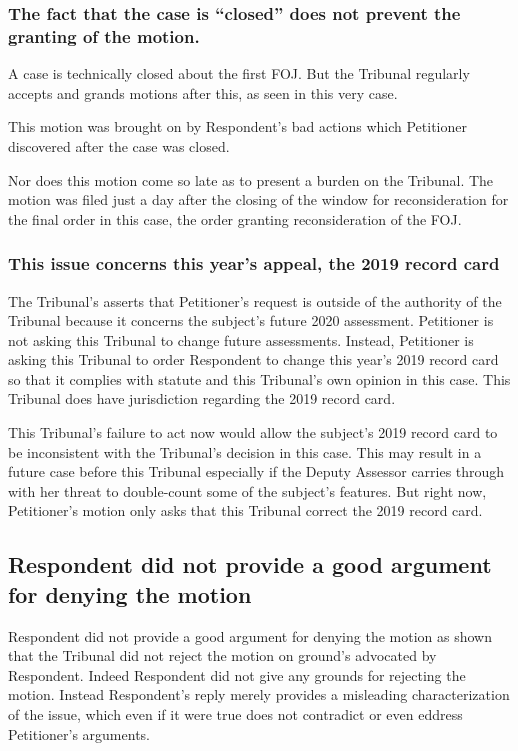 \documentclass[12pt,\documentclassflag]{michiganCourtOfAppealsBrief}
\begin{document}
\subsubsection{The fact that the case is ``closed'' does not prevent the granting of the motion.}

A case is technically closed about the first FOJ. But the Tribunal regularly accepts and grands motions after this, as seen in this very case.

This motion was brought on by Respondent's bad actions which Petitioner discovered after the case was closed.

Nor does this motion come so late as to present a burden on the Tribunal. The motion was filed just a day after the closing of the window for reconsideration for the final order in this case, the order granting reconsideration of the FOJ.

\subsubsection{This issue concerns this year's appeal, the 2019 record card}

The Tribunal's asserts that Petitioner's request is outside of the authority of the Tribunal because it concerns the subject's future 2020 assessment. Petitioner is not asking this Tribunal to change future assessments. Instead, Petitioner is asking this Tribunal to order Respondent to change this year's 2019 record card so that it complies with statute and this Tribunal's own opinion in this case. This Tribunal does have jurisdiction regarding the 2019 record card.

This Tribunal's failure to act now would allow the subject's 2019 record card to be inconsistent with the Tribunal's decision in this case. This may result in a future case before this Tribunal especially if the Deputy Assessor carries through with her threat to double-count some of the subject's features. But right now, Petitioner's motion only asks that this Tribunal correct the 2019 record card.

\subsection{Respondent did not provide a good argument for denying the motion}

Respondent did not provide a good argument for denying the motion as shown that the Tribunal did not reject the motion on ground's advocated by Respondent. Indeed Respondent did not give any grounds for rejecting the motion. Instead Respondent's reply merely provides a misleading characterization of the issue, which even if it were true does not contradict or even eddress Petitioner's arguments.
\end{document}
